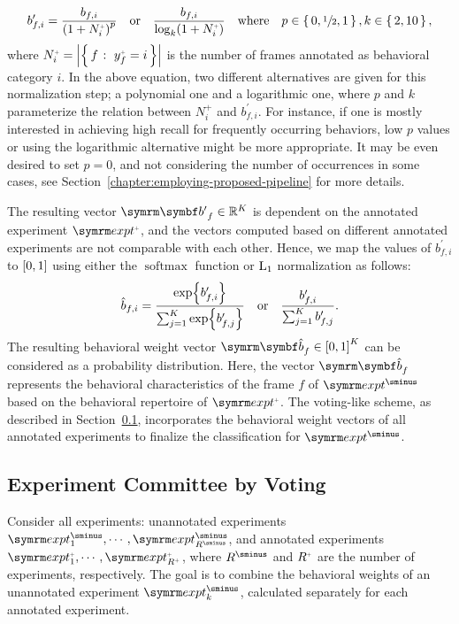 \begin{equation}
	b^\prime_{f,i} = \frac{b_{f,i}}{\rbr{1 + N^{\plus}_i}^p} \qbor \frac{b_{f,i}}{\log_k(1 + N^{\plus}_i)} \qbwhere p \in \set{0, \sfrac{1}{2}, 1}, k \in \set{2, 10},
\end{equation}
where $N^{\plus}_i = \card*{\Set{f}{y^{\plus}_f=i}}$ is the number of frames annotated as behavioral category $i$.
In the above equation, two different alternatives are given for this normalization step; a polynomial one and a logarithmic one, where $p$ and $k$ parameterize the relation between $N^{\plus}_i$ and $b^\prime_{f,i}$.
For instance, if one is mostly interested in achieving high recall for frequently occurring behaviors, low $p$ values or using the logarithmic alternative might be more appropriate.
It may be even desired to set $p=0$, and not considering the number of occurrences in some cases, see Section~\ref{chapter:employing-proposed-pipeline} for more details.

The resulting vector $\V{b^{\prime}}_f \in \reals^K$ is dependent on the annotated experiment $\exptAnn$, and the vectors computed based on different annotated experiments are not comparable with each other.
Hence, we map the values of $b^\prime_{f,i}$ to $\left[0,1\right]$ using either the $\operatorname {softmax}$ function or $\textnormal{L}_1$ normalization as follows:
\begin{equation}
	\hat{b}_{f,i} = \frac{\exp{b^\prime_{f,i}}}{\sum_{j=1}^{K} \exp{b^\prime_{f,j}}} \quad \textnormal{or} \quad \frac{b^\prime_{f,i}}{\sum_{j=1}^{K} b^\prime_{f,j}}.
\end{equation}
The resulting behavioral weight vector $\V{\hat{b}}_f \in \sqbr{0,1}^K$ can be considered as a probability distribution.
Here, the vector $\V{\hat{b}}_f$ represents the behavioral characteristics of the frame $f$ of $\exptUnann$ based on the behavioral repertoire of $\exptAnn$.
The voting-like scheme, as described in Section~\ref{section:committee-voting}, incorporates the behavioral weight vectors of all annotated experiments to finalize the classification for $\exptUnann$.

\subsection{Experiment Committee by Voting}\label{section:committee-voting}
Consider all experiments: unannotated experiments $\exptUnann_1, \cdots, \exptUnann_{\Unann{R}}$, and annotated experiments $\exptAnn_1, \cdots, \exptAnn_{\Ann{R}}$, where $\Unann{R}$ and $\Ann{R}$ are the number of experiments, respectively.
The goal is to combine the behavioral weights of an unannotated experiment $\exptUnann_k$, calculated separately for each annotated experiment.

